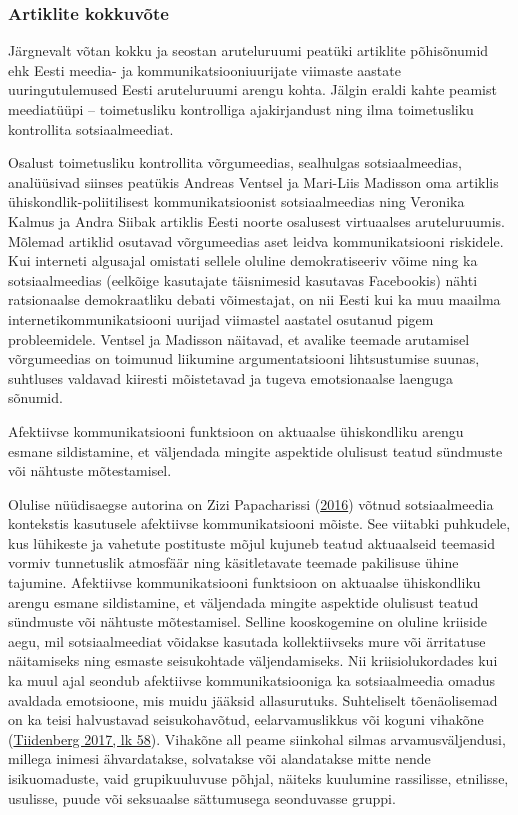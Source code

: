 \documentclass[estonian,]{article}
\begin{document}
\hypertarget{artiklite-kokkuvuxf5te}{%
\subsubsection*{Artiklite kokkuvõte}\label{artiklite-kokkuvuxf5te}}

Järgnevalt võtan kokku ja seostan aruteluruumi peatüki artiklite põhisõnumid ehk Eesti meedia- ja kommunikatsiooniuurijate viimaste aastate uuringutulemused Eesti aruteluruumi arengu kohta. Jälgin eraldi kahte peamist meediatüüpi -- toimetusliku kontrolliga ajakirjandust ning ilma toimetusliku kontrollita sotsiaalmeediat.

Osalust toimetusliku kontrollita võrgumeedias, sealhulgas sotsiaalmeedias, analüüsivad siinses peatükis Andreas Ventsel ja Mari-Liis Madisson oma artiklis ühiskondlik-poliitilisest kommunikatsioonist sotsiaalmeedias ning Veronika Kalmus ja Andra Siibak artiklis Eesti noorte osalusest virtuaalses aruteluruumis. Mõlemad artiklid osutavad võrgumeedias aset leidva kommunikatsiooni riskidele. Kui interneti algusajal omistati sellele oluline demokratiseeriv võime ning ka sotsiaalmeedias (eelkõige kasutajate täisnimesid kasutavas Facebookis) nähti ratsionaalse demokraatliku debati võimestajat, on nii Eesti kui ka muu maailma internetikommunikatsiooni uurijad viimastel aastatel osutanud pigem probleemidele. Ventsel ja Madisson näitavad, et avalike teemade arutamisel võrgumeedias on toimunud liikumine argumentatsiooni lihtsustumise suunas, suhtluses valdavad kiiresti mõistetavad ja tugeva emotsionaalse laenguga sõnumid.

\begin{blockquote-left}
Afektiivse kommunikatsiooni funktsioon on aktuaalse ühiskondliku arengu
esmane sildistamine, et väljendada mingite aspektide olulisust teatud
sündmuste või nähtuste mõtestamisel.
\end{blockquote-left}

Olulise nüüdisaegse autorina on Zizi Papacharissi (\protect\hyperlink{Papacharissi2016}{2016}) võtnud sotsiaalmeedia kontekstis kasutusele afektiivse kommunikatsiooni mõiste. See viitabki puhkudele, kus lühikeste ja vahetute postituste mõjul kujuneb teatud aktuaalseid teemasid vormiv tunnetuslik atmosfäär ning käsitletavate teemade pakilisuse ühine tajumine. Afektiivse kommunikatsiooni funktsioon on aktuaalse ühiskondliku arengu esmane sildistamine, et väljendada mingite aspektide olulisust teatud sündmuste või nähtuste mõtestamisel. Selline kooskogemine on oluline kriiside aegu, mil sotsiaalmeediat võidakse kasutada kollektiivseks mure või ärritatuse näitamiseks ning esmaste seisukohtade väljendamiseks. Nii kriisiolukordades kui ka muul ajal seondub afektiivse kommunikatsiooniga ka sotsiaalmeedia omadus avaldada emotsioone, mis muidu jääksid allasurutuks. Suhteliselt tõenäolisemad on ka teisi halvustavad seisukohavõtud, eelarvamuslikkus või koguni vihakõne (\protect\hyperlink{Tiidenberg2017}{Tiidenberg 2017, lk 58}). Vihakõne all peame siinkohal silmas arvamusväljendusi, millega inimesi ähvardatakse, solvatakse või alandatakse mitte nende isikuomaduste, vaid grupikuuluvuse põhjal, näiteks kuulumine rassilisse, etnilisse, usulisse, puude või seksuaalse sättumusega seonduvasse gruppi.
\end{document}
